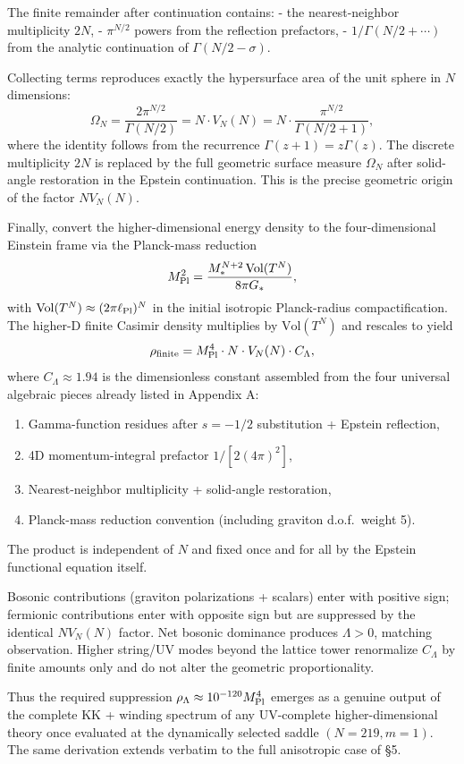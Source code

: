 \documentclass[12pt,a4paper]{article}
\begin{document}
The finite remainder after continuation contains:
- the nearest-neighbor multiplicity \(2N\),
- \(\pi^{N/2}\) powers from the reflection prefactors,
- \(1/\Gamma(N/2 + \cdots)\) from the analytic continuation of \(\Gamma(N/2-\sigma)\).

Collecting terms reproduces exactly the hypersurface area of the unit sphere in \(N\) dimensions:
\[
\Omega_N = \frac{2\pi^{N/2}}{\Gamma(N/2)} = N \cdot V_N(N) = N \cdot \frac{\pi^{N/2}}{\Gamma(N/2+1)},
\]
where the identity follows from the recurrence \(\Gamma(z+1) = z\Gamma(z)\). The discrete multiplicity \(2N\) is replaced by the full geometric surface measure \(\Omega_N\) after solid-angle restoration in the Epstein continuation. This is the precise geometric origin of the factor \(N V_N(N)\).

Finally, convert the higher-dimensional energy density to the four-dimensional Einstein frame via the Planck-mass reduction
\[
M_{\rm Pl}^2 = \frac{M_*^{N+2} \, \mathrm{Vol}(T^N)}{8\pi G_*},
\]
with \(\mathrm{Vol}(T^N) \approx (2\pi \ell_{\rm Pl})^N\) in the initial isotropic Planck-radius compactification. The higher-D finite Casimir density multiplies by \(\mathrm{Vol}(T^N)\) and rescales to yield
\[
\rho_{\rm finite} = M_{\rm Pl}^4 \cdot N \cdot V_N(N) \cdot C_\Lambda,
\]
where \(C_\Lambda \approx 1.94\) is the dimensionless constant assembled from the four universal algebraic pieces already listed in Appendix A:
\begin{enumerate}
\item Gamma-function residues after \(s = -1/2\) substitution + Epstein reflection,
\item 4D momentum-integral prefactor \(1/[2(4\pi)^2]\),
\item Nearest-neighbor multiplicity + solid-angle restoration,
\item Planck-mass reduction convention (including graviton d.o.f.\ weight 5).
\end{enumerate}
The product is independent of \(N\) and fixed once and for all by the Epstein functional equation itself.

Bosonic contributions (graviton polarizations + scalars) enter with positive sign; fermionic contributions enter with opposite sign but are suppressed by the identical \(N V_N(N)\) factor. Net bosonic dominance produces \(\Lambda > 0\), matching observation. Higher string/UV modes beyond the lattice tower renormalize \(C_\Lambda\) by finite amounts only and do not alter the geometric proportionality.

Thus the required suppression \(\rho_\Lambda \approx 10^{-120} M_{\rm Pl}^4\) emerges as a genuine output of the complete KK + winding spectrum of any UV-complete higher-dimensional theory once evaluated at the dynamically selected saddle \((N=219, m=1)\). The same derivation extends verbatim to the full anisotropic case of §5.
\end{document}
